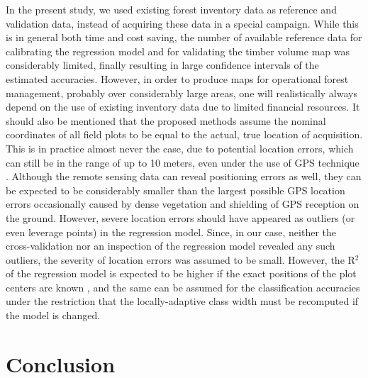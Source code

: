 In the present study, we used existing forest inventory data as reference and validation data, instead of acquiring these data in a special campaign. While this is in general both time and cost saving, the number of available reference data for calibrating the regression model and for validating the timber volume map was considerably limited, finally resulting in large confidence intervals of the estimated accuracies. However, in order to produce maps for operational forest management, probably over considerably large areas, one will realistically always depend on the use of existing inventory data due to limited financial resources. It should also be mentioned that the proposed methods assume the nominal coordinates of all field plots to be equal to the actual, true location of acquisition. This is in practice almost never the case, due to potential location errors, which can still be in the range of up to 10 meters, even under the use of GPS technique \citep{mauro2010, steinmann2013}. Although the remote sensing data can reveal positioning errors as well, they can be expected to be considerably smaller than the largest possible GPS location errors occasionally caused by dense vegetation and shielding of GPS reception on the ground. However, severe location errors should have appeared as outliers (or even leverage points) in the regression model. Since, in our case, neither the cross-validation nor an inspection of the regression model revealed any such outliers, the severity of location errors was assumed to be small. However, the R$^2$ of the regression model is expected to be higher if the exact positions of the plot centers are known \citep{fuller2009}, and the same can be assumed for the classification accuracies under the restriction that the locally-adaptive class width must be recomputed if the model is changed.



\section{Conclusion}
\label{sec:conc}


